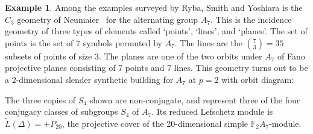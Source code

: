 \documentclass[12pt]{amsart}
\theoremstyle{plain}
\theoremstyle{definition}
\newtheorem{example}[theorem]{Example}
\theoremstyle{remark}
\numberwithin{equation}{section}
\def\FF{{\mathbb F}}
\begin{document}
\begin{example}\label{ex:c3}
    Among the examples surveyed by Ryba, Smith and Yoshiara is the $C_3$ geometry of Neumaier~\cite{Neu1984} for the alternating group $A_7$. This is the incidence geometry of three types of elements called `points', `lines', and `planes'. The set of points is the set of 7 symbols permuted by $A_7$. The lines are the $\binom{7}{3}=35$ subsets of points of size 3. The planes are one of the two orbits under $A_7$ of Fano projective planes consisting of 7 points and 7 lines. This geometry turns out to be a 2-dimensional slender synthetic building for $A_7$ at $p=2$ with orbit diagram:
    \begin{center}
\end{center}
The three copies of $S_4$ shown are non-conjugate, and represent three of the four conjugacy classes of subgroups $S_4$ of $A_7$. Its reduced Lefschetz module is $\tilde L(\Delta) = +P_{20}$, the projective cover of the 20-dimensional simple $\FF_2A_7$-module.
        

\end{example}
\end{document}
